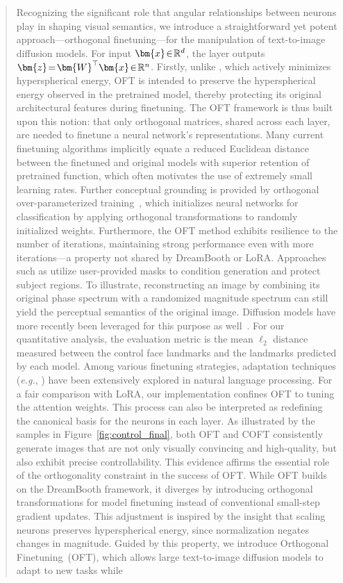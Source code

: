\begin{itemize}[leftmargin=*,nosep]
\begin{abstract}
Recognizing the significant role that angular relationships between neurons play in shaping visual semantics, we introduce a straightforward yet potent approach—orthogonal finetuning—for the manipulation of text-to-image diffusion models. For input $\thickmuskip=2mu \medmuskip=2mu \bm{x}\in\mathbb{R}^d$, the layer outputs $\thickmuskip=2mu \medmuskip=2mu \bm{z}=\bm{W}^\top\bm{x}\in\mathbb{R}^n$. Firstly, unlike \cite{liu2021orthogonal}, which actively minimizes hyperspherical energy, OFT is intended to preserve the hyperspherical energy observed in the pretrained model, thereby protecting its original architectural features during finetuning. The OFT framework is thus built upon this notion: that only orthogonal matrices, shared across each layer, are needed to finetune a neural network’s representations. Many current finetuning algorithms implicitly equate a reduced Euclidean distance between the finetuned and original models with superior retention of pretrained function, which often motivates the use of extremely small learning rates. Further conceptual grounding is provided by orthogonal over-parameterized training~\cite{liu2021orthogonal}, which initializes neural networks for classification by applying orthogonal transformations to randomly initialized weights. Furthermore, the OFT method exhibits resilience to the number of iterations, maintaining strong performance even with more iterations—a property not shared by DreamBooth or LoRA. Approaches such as \cite{avrahami2022blended,nichol2022glide} utilize user-provided masks to condition generation and protect subject regions. To illustrate, reconstructing an image by combining its original phase spectrum with a randomized magnitude spectrum can still yield the perceptual semantics of the original image. Diffusion models have more recently been leveraged for this purpose as well~\cite{saharia2022palette,voynov2022sketch,wang2022pretraining}. For our quantitative analysis, the evaluation metric is the mean $\ell_2$ distance measured between the control face landmarks and the landmarks predicted by each model. Among various finetuning strategies, adaptation techniques (\emph{e.g.}, \cite{hulora2022,houlsby2019parameter,pfeiffer2020adapterfusion}) have been extensively explored in natural language processing. For a fair comparison with LoRA, our implementation confines OFT to tuning the attention weights. This process can also be interpreted as redefining the canonical basis for the neurons in each layer. As illustrated by the samples in Figure~\ref{fig:control_final}, both OFT and COFT consistently generate images that are not only visually convincing and high-quality, but also exhibit precise controllability. This evidence affirms the essential role of the orthogonality constraint in the success of OFT. While OFT builds on the DreamBooth framework, it diverges by introducing orthogonal transformations for model finetuning instead of conventional small-step gradient updates. This adjustment is inspired by the insight that scaling neurons preserves hyperspherical energy, since normalization negates changes in magnitude. Guided by this property, we introduce Orthogonal Finetuning~(OFT), which allows large text-to-image diffusion models to adapt to new tasks while 
\end{abstract}
\end{itemize}
